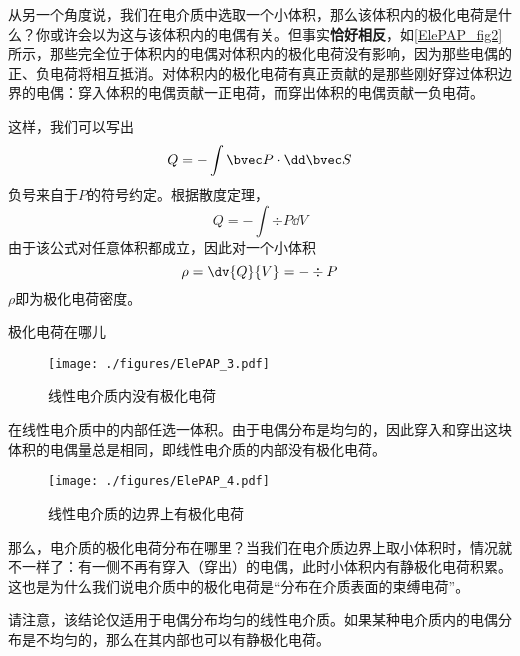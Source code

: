 从另一个角度说，我们在电介质中选取一个小体积，那么该体积内的极化电荷是什么？你或许会以为这与该体积内的电偶有关。但事实\textbf{恰好相反}，如\autoref{ElePAP_fig2} 所示，那些完全位于体积内的电偶对体积内的极化电荷没有影响，因为那些电偶的正、负电荷将相互抵消。对体积内的极化电荷有真正贡献的是那些刚好穿过体积边界的电偶：穿入体积的电偶贡献一正电荷，而穿出体积的电偶贡献一负电荷。

这样，我们可以写出
$$
Q= - \int \bvec P \cdot \dd \bvec S
$$
负号来自于$P$的符号约定。根据散度定理，
$$
Q= - \int \div P \dd V
$$
由于该公式对任意体积都成立，因此对一个小体积
\begin{equation}
\rho = \dv{Q}{V}= - \div P
\end{equation}
$\rho$即为极化电荷密度。

\begin{example}{极化电荷在哪儿}
\begin{figure}[ht]
\centering
\texttt{[image: ./figures/ElePAP\_3.pdf]}
\caption{线性电介质内没有极化电荷} \label{ElePAP_fig3}
\end{figure}

在线性电介质中的内部任选一体积。由于电偶分布是均匀的，因此穿入和穿出这块体积的电偶量总是相同，即线性电介质的内部没有极化电荷。

\begin{figure}[ht]
\centering
\texttt{[image: ./figures/ElePAP\_4.pdf]}
\caption{线性电介质的边界上有极化电荷} \label{ElePAP_fig4}
\end{figure}
那么，电介质的极化电荷分布在哪里？当我们在电介质边界上取小体积时，情况就不一样了：有一侧不再有穿入（穿出）的电偶，此时小体积内有静极化电荷积累。这也是为什么我们说电介质中的极化电荷是“分布在介质表面的束缚电荷”。

请注意，该结论仅适用于电偶分布均匀的线性电介质。如果某种电介质内的电偶分布是不均匀的，那么在其内部也可以有静极化电荷。
\end{example}
